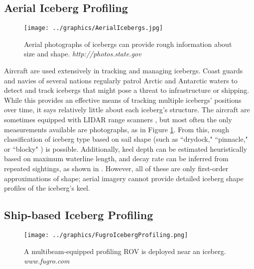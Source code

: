 

\subsection{Aerial Iceberg Profiling}

\begin{figure}[!htb]
   \centering
   \texttt{[image: ../graphics/AerialIcebergs.jpg]} %
   \caption{ Aerial photographs of icebergs can provide rough information about size and shape. \emph{http://photos.state.gov}}
   \label{fig:IcebergAerial}
\end{figure}

Aircraft are used extensively in tracking and managing icebergs. Coast guards and navies of several nations regularly patrol Arctic and Antarctic waters to detect and track icebergs that might pose a threat to infrastructure or shipping. While this provides an effective means of tracking multiple icebergs' positions over time, it says relatively little about each iceberg's structure. The aircraft are sometimes equipped with LIDAR range scanners \cite{Bunkin2012}, but most often the only measurements available are photographs, as in Figure \ref{fig:IcebergAerial}. From this, rough classification of iceberg type based on sail shape (such as ``drydock," ``pinnacle," or ``blocky" ) is possible. Additionally, keel depth can be estimated heuristically based on maximum waterline length, and decay rate can be inferred from repeated sightings, as shown in \cite{Barker2004}. However, all of these are only first-order approximations of shape; aerial imagery cannot provide detailed iceberg shape profiles of the iceberg's keel. 

\subsection{Ship-based Iceberg Profiling}

\begin{figure}[!htb]
   \centering
   \texttt{[image: ../graphics/FugroIcebergProfiling.png]} %
   \caption{ A multibeam-equipped profiling ROV is deployed near an iceberg. \emph{www.fugro.com}}
   \label{fig:IcebergROV}
\end{figure}

